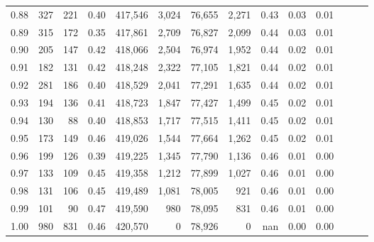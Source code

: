 \begin{tabular}{rrrrrrrrrrrrrr}
0.88 &     327 &    221 &  0.40 &  417,546 &    3,024 &  76,655 &   2,271 &  0.43 &  0.03 &      0.01 \\
0.89 &     315 &    172 &  0.35 &  417,861 &    2,709 &  76,827 &   2,099 &  0.44 &  0.03 &      0.01 \\
0.90 &     205 &    147 &  0.42 &  418,066 &    2,504 &  76,974 &   1,952 &  0.44 &  0.02 &      0.01 \\
0.91 &     182 &    131 &  0.42 &  418,248 &    2,322 &  77,105 &   1,821 &  0.44 &  0.02 &      0.01 \\
0.92 &     281 &    186 &  0.40 &  418,529 &    2,041 &  77,291 &   1,635 &  0.44 &  0.02 &      0.01 \\
0.93 &     194 &    136 &  0.41 &  418,723 &    1,847 &  77,427 &   1,499 &  0.45 &  0.02 &      0.01 \\
0.94 &     130 &     88 &  0.40 &  418,853 &    1,717 &  77,515 &   1,411 &  0.45 &  0.02 &      0.01 \\
0.95 &     173 &    149 &  0.46 &  419,026 &    1,544 &  77,664 &   1,262 &  0.45 &  0.02 &      0.01 \\
0.96 &     199 &    126 &  0.39 &  419,225 &    1,345 &  77,790 &   1,136 &  0.46 &  0.01 &      0.00 \\
0.97 &     133 &    109 &  0.45 &  419,358 &    1,212 &  77,899 &   1,027 &  0.46 &  0.01 &      0.00 \\
0.98 &     131 &    106 &  0.45 &  419,489 &    1,081 &  78,005 &     921 &  0.46 &  0.01 &      0.00 \\
0.99 &     101 &     90 &  0.47 &  419,590 &      980 &  78,095 &     831 &  0.46 &  0.01 &      0.00 \\
1.00 &     980 &    831 &  0.46 &  420,570 &        0 &  78,926 &       0 &   nan &  0.00 &      0.00 \\
\bottomrule
\end{tabular}
